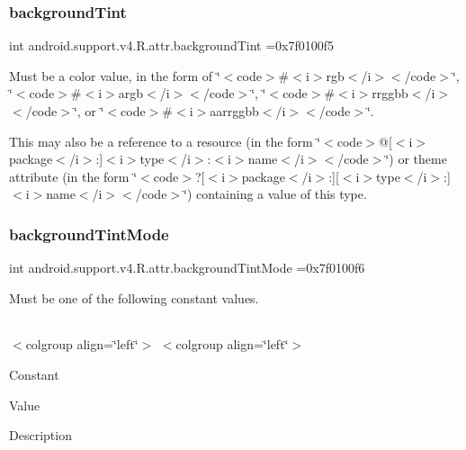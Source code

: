 \subsubsection{\texorpdfstring{background\+Tint}{backgroundTint}}
{\footnotesize\ttfamily int android.\+support.\+v4.\+R.\+attr.\+background\+Tint =0x7f0100f5\hspace{0.3cm}{\ttfamily [static]}}

Must be a color value, in the form of \char`\"{}$<$code$>$\#$<$i$>$rgb$<$/i$>$$<$/code$>$\char`\"{}, \char`\"{}$<$code$>$\#$<$i$>$argb$<$/i$>$$<$/code$>$\char`\"{}, \char`\"{}$<$code$>$\#$<$i$>$rrggbb$<$/i$>$$<$/code$>$\char`\"{}, or \char`\"{}$<$code$>$\#$<$i$>$aarrggbb$<$/i$>$$<$/code$>$\char`\"{}. 

This may also be a reference to a resource (in the form \char`\"{}$<$code$>$@\mbox{[}$<$i$>$package$<$/i$>$\+:\mbox{]}$<$i$>$type$<$/i$>$\+:$<$i$>$name$<$/i$>$$<$/code$>$\char`\"{}) or theme attribute (in the form \char`\"{}$<$code$>$?\mbox{[}$<$i$>$package$<$/i$>$\+:\mbox{]}\mbox{[}$<$i$>$type$<$/i$>$\+:\mbox{]}$<$i$>$name$<$/i$>$$<$/code$>$\char`\"{}) containing a value of this type. \mbox{\label{classandroid_1_1support_1_1v4_1_1R_1_1attr_a7169568146e422cf98009d4a36ee607c}} 
\subsubsection{\texorpdfstring{background\+Tint\+Mode}{backgroundTintMode}}
{\footnotesize\ttfamily int android.\+support.\+v4.\+R.\+attr.\+background\+Tint\+Mode =0x7f0100f6\hspace{0.3cm}{\ttfamily [static]}}

Must be one of the following constant values.

\tabulinesep=1mm
\begin{longtabu} spread 0pt [c]{*{0}{|X[-1]}|}
\hline
\end{longtabu}
$<$colgroup align=\char`\"{}left\char`\"{}$>$ $<$colgroup align=\char`\"{}left\char`\"{}$>$ 

Constant

Value

Description 

